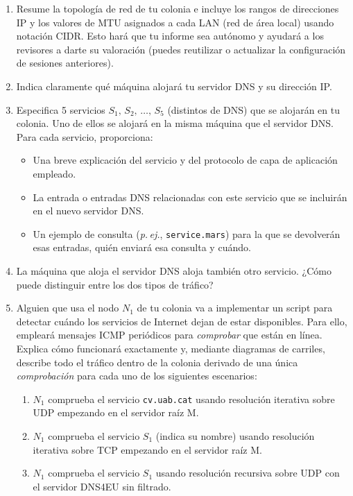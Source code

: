 \begin{enumerate}[itemsep=0.1cm]
\item Resume la topología de red de tu colonia e incluye los rangos de direcciones IP y los valores de MTU asignados a cada LAN (red de área local) usando notación CIDR. Esto hará que tu informe sea autónomo y ayudará a los revisores a darte su valoración (puedes reutilizar o actualizar la configuración de sesiones anteriores).

\item Indica claramente qué máquina alojará tu servidor DNS y su dirección IP.

\item Especifica 5 servicios $S_1,\,S_2,\,\ldots,\,S_5$ (distintos de DNS) que se alojarán en tu colonia. Uno de ellos se alojará en la misma máquina que el servidor DNS. Para cada servicio, proporciona:
    \begin{itemize}[itemsep=0.1cm]
    \item Una breve explicación del servicio y del protocolo de capa de aplicación empleado.
    \item La entrada o entradas DNS relacionadas con este servicio que se incluirán en el nuevo servidor DNS.
    \item Un ejemplo de consulta (\textit{p.\,ej.}, \texttt{service.mars}) para la que se devolverán esas entradas, quién enviará esa consulta y cuándo.
    \end{itemize}

\item La máquina que aloja el servidor DNS aloja también otro servicio. ¿Cómo puede distinguir entre los dos tipos de tráfico?

\item Alguien que usa el nodo $N_1$ de tu colonia va a implementar un script para detectar cuándo los servicios de Internet dejan de estar disponibles. Para ello, empleará mensajes ICMP periódicos para \textit{comprobar} que están en línea. Explica cómo funcionará exactamente y, mediante diagramas de carriles, describe todo el tráfico dentro de la colonia derivado de una única \textit{comprobación} para cada uno de los siguientes escenarios:
    \begin{enumerate}[itemsep=0.1cm]
    \item $N_1$ comprueba el servicio \texttt{cv.uab.cat} usando resolución iterativa sobre UDP empezando en el servidor raíz M.
    \item $N_1$ comprueba el servicio $S_1$ (indica su nombre) usando resolución iterativa sobre TCP empezando en el servidor raíz M.
    \item $N_1$ comprueba el servicio $S_1$ usando resolución recursiva sobre UDP con el servidor DNS4EU sin filtrado.
    \end{enumerate}


\end{enumerate}
